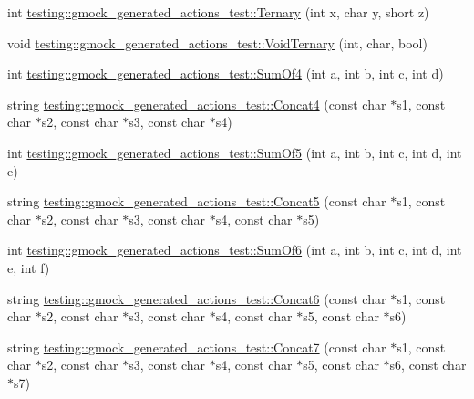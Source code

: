 \begin{DoxyCompactItemize}
\item 
int \hyperlink{namespacetesting_1_1gmock__generated__actions__test_a1b234626e33284c4159ea666d240d5ed}{testing\+::gmock\+\_\+generated\+\_\+actions\+\_\+test\+::\+Ternary} (int x, char y, short z)
\item 
void \hyperlink{namespacetesting_1_1gmock__generated__actions__test_a7b1b519421c70b90ea3c818d4cf565ac}{testing\+::gmock\+\_\+generated\+\_\+actions\+\_\+test\+::\+Void\+Ternary} (int, char, bool)
\item 
int \hyperlink{namespacetesting_1_1gmock__generated__actions__test_a2a5879c060adacf27c3528260172a7be}{testing\+::gmock\+\_\+generated\+\_\+actions\+\_\+test\+::\+Sum\+Of4} (int a, int b, int c, int d)
\item 
string \hyperlink{namespacetesting_1_1gmock__generated__actions__test_a18260e53a4612dc68eaa3b43a13ad57e}{testing\+::gmock\+\_\+generated\+\_\+actions\+\_\+test\+::\+Concat4} (const char $\ast$s1, const char $\ast$s2, const char $\ast$s3, const char $\ast$s4)
\item 
int \hyperlink{namespacetesting_1_1gmock__generated__actions__test_a7ebfbfdf11d92d4f99df6b659c371e74}{testing\+::gmock\+\_\+generated\+\_\+actions\+\_\+test\+::\+Sum\+Of5} (int a, int b, int c, int d, int e)
\item 
string \hyperlink{namespacetesting_1_1gmock__generated__actions__test_ac9d254c06f94974ffb0acd8d0f1f8d88}{testing\+::gmock\+\_\+generated\+\_\+actions\+\_\+test\+::\+Concat5} (const char $\ast$s1, const char $\ast$s2, const char $\ast$s3, const char $\ast$s4, const char $\ast$s5)
\item 
int \hyperlink{namespacetesting_1_1gmock__generated__actions__test_a3f60acee43510c1603549a1f3bab61ad}{testing\+::gmock\+\_\+generated\+\_\+actions\+\_\+test\+::\+Sum\+Of6} (int a, int b, int c, int d, int e, int f)
\item 
string \hyperlink{namespacetesting_1_1gmock__generated__actions__test_a0d9c60ff363796e3edec3587ce7fc856}{testing\+::gmock\+\_\+generated\+\_\+actions\+\_\+test\+::\+Concat6} (const char $\ast$s1, const char $\ast$s2, const char $\ast$s3, const char $\ast$s4, const char $\ast$s5, const char $\ast$s6)
\item 
string \hyperlink{namespacetesting_1_1gmock__generated__actions__test_ac53c9939d35ebbb093b795161fc42504}{testing\+::gmock\+\_\+generated\+\_\+actions\+\_\+test\+::\+Concat7} (const char $\ast$s1, const char $\ast$s2, const char $\ast$s3, const char $\ast$s4, const char $\ast$s5, const char $\ast$s6, const char $\ast$s7)

\end{DoxyCompactItemize}
